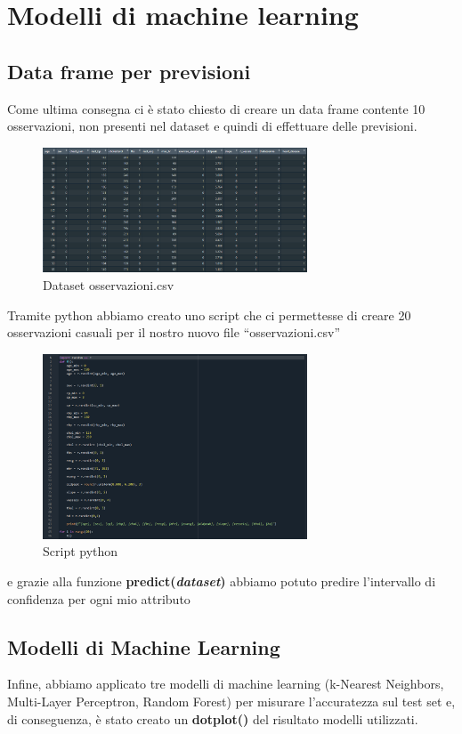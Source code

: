 \documentclass{article}
\begin{document}
\clearpage
\section{ Modelli di machine learning }
\subsection { Data frame per previsioni }
Come ultima consegna ci è stato chiesto di creare un data frame contente 10 osservazioni, non presenti nel dataset e quindi di effettuare delle previsioni.

\begin{figure}[h]
	\centering
	\includegraphics[width=0.7\textwidth]{data frame creato}
	\caption{Dataset osservazioni.csv}
	\label {fig:ds1}
\end{figure}

Tramite python abbiamo creato uno script che ci permettesse di creare 20 osservazioni casuali per il nostro nuovo file “osservazioni.csv”\\
\begin{figure}[h]
	\centering
	\includegraphics[width=0.7\textwidth]{script python}
	\caption{Script python}
	\label {fig:ds1}
\end{figure}

 e grazie alla funzione \textbf{predict(\textit{dataset})} abbiamo potuto predire l’intervallo di confidenza per ogni mio attributo

\subsection{ Modelli di Machine Learning }
Infine, abbiamo applicato tre modelli di machine learning (k-Nearest Neighbors, Multi-Layer Perceptron, Random Forest) per misurare l’accuratezza sul test set e, di conseguenza, è stato creato un \textbf{dotplot()} del risultato modelli utilizzati.
\end{document}

